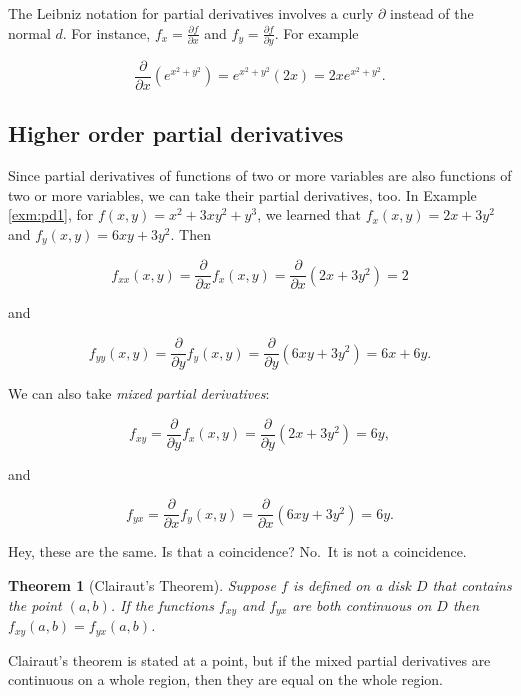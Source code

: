 \documentclass[
]{book}
\newtheorem{theorem}{Theorem}[chapter]
\theoremstyle{definition}
\theoremstyle{definition}
\theoremstyle{definition}
\theoremstyle{definition}
\theoremstyle{remark}
\begin{document}
The Leibniz notation for partial derivatives involves a curly \(\partial\) instead of the normal \(d\). For instance, \(f_x=\frac{\partial f}{\partial x}\) and \(f_y=\frac{\partial f}{\partial y}.\) For example

\[\frac{\partial}{\partial x}\left(e^{x^2+y^2}\right)=e^{x^2+y^2}(2x)=2xe^{x^2+y^2}.\]

\subsection*{Higher order partial derivatives}\label{higher-order-partial-derivatives}

Since partial derivatives of functions of two or more variables are also functions of two or more variables, we can take their partial derivatives, too. In Example \ref{exm:pd1}, for \(f(x,y)=x^2+3xy^2+y^3\), we learned that \(f_x(x,y)=2x+3y^2\) and \(f_y(x,y)=6xy+3y^2\). Then

\[f_{xx}(x,y)=\frac{\partial}{\partial x}f_x(x,y)=\frac{\partial}{\partial x}(2x+3y^2)=2\]

and

\[f_{yy}(x,y)=\frac{\partial}{\partial y}f_y(x,y)=\frac{\partial}{\partial y}(6xy+3y^2)=6x+6y.\]

We can also take \emph{mixed partial derivatives}:

\[f_{xy}=\frac{\partial}{\partial y}f_x(x,y)=\frac{\partial}{\partial y}(2x+3y^2)=6y,\]

and

\[f_{yx}=\frac{\partial}{\partial x}f_y(x,y)=\frac{\partial}{\partial x}(6xy+3y^2)=6y.\]

Hey, these are the same. Is that a coincidence? No.~It is not a coincidence.

\begin{theorembox}

\begin{theorem}[Clairaut's Theorem]
Suppose \(f\) is defined on a disk \(D\) that contains the point \((a,b)\). If the functions \(f_{xy}\) and \(f_{yx}\) are both continuous on \(D\) then \(f_{xy}(a,b)=f_{yx}(a,b)\).
\end{theorem}

\end{theorembox}

Clairaut's theorem is stated at a point, but if the mixed partial derivatives are continuous on a whole region, then they are equal on the whole region.
\end{document}
